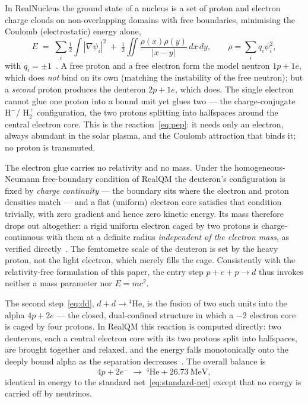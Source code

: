\documentclass[11pt]{article}
\begin{document}
In RealNucleus the ground state of a nucleus is a set of proton and electron charge clouds on
non-overlapping domains with free boundaries, minimising the Coulomb (electrostatic) energy alone,
\begin{equation}
E \;=\; \sum_i \tfrac{1}{2}\!\int|\nabla\psi_i|^2
\;+\; \tfrac12\!\iint\frac{\rho(x)\rho(y)}{|x-y|}\,dx\,dy, \qquad \rho=\sum_i q_i\psi_i^2 ,
\label{eq:energy}
\end{equation}
with $q_i=\pm1$~\cite{Johnson-RealQM,Johnson-RealNucleus}. A free proton and a free electron form the
model neutron $1p+1e$, which does \emph{not} bind on its own (matching the instability of the free
neutron); but a \emph{second} proton produces the deuteron $2p+1e$, which does. The single electron
cannot glue one proton into a bound unit yet glues two --- the charge-conjugate $\mathrm{H}^-$/
$\mathrm{H}_2^{+}$ configuration, the two protons splitting into halfspaces around the central electron
core. This is the reaction~\eqref{eq:pep}: it needs only an electron, always abundant in the solar
plasma, and the Coulomb attraction that binds it; no proton is transmuted.

The electron glue carries no relativity and no mass. Under the homogeneous-Neumann free-boundary
condition of RealQM the deuteron's configuration is fixed by \emph{charge continuity} --- the boundary
sits where the electron and proton densities match --- and a flat (uniform) electron core satisfies that
condition trivially, with zero gradient and hence zero kinetic energy. Its mass therefore drops out
altogether: a rigid uniform electron caged by two protons is charge-continuous with them at a definite
radius \emph{independent of the electron mass}, as verified directly~\cite{Johnson-RealNucleus}. The
femtometre scale of the deuteron is set by the heavy proton, not the light electron, which merely fills
the cage. Consistently with the relativity-free formulation of this paper, the entry step $p+e+p\to d$
thus invokes neither a mass parameter nor $E=mc^2$.

The second step~\eqref{eq:dd}, $d+d\to{}^4\mathrm{He}$, is the fusion of two such units into the alpha
$4p+2e$ --- the closed, dual-confined structure in which a $-2$ electron core is caged by four
protons. In RealQM this reaction is computed directly: two deuterons, each a central electron core
with its two protons split into halfspaces, are brought together and relaxed, and the energy falls
monotonically onto the deeply bound alpha as the separation decreases~\cite{Johnson-RealNucleus}. The
overall balance is
\begin{equation}
4p + 2e^- \;\longrightarrow\; {}^4\mathrm{He} + 26.73~\text{MeV},
\label{eq:coulomb-net}
\end{equation}
identical in energy to the standard net~\eqref{eq:standard-net} except that no energy is carried off by
neutrinos.
\end{document}

